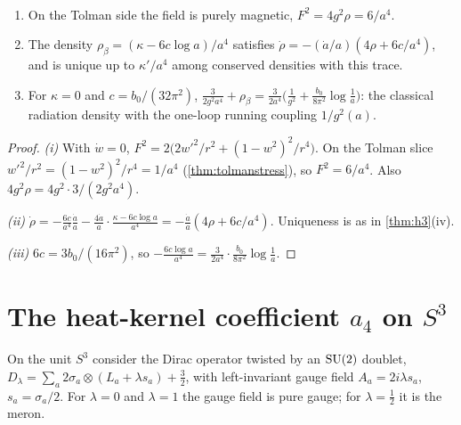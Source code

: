 \begin{proposition}\label{prop:running}\ver\
\begin{enumerate}[label=(\roman*)]
\item On the Tolman side the field is purely magnetic, $F^2=4g^2\rho=6/a^4$.
\item The density $\rho_\beta=(\kappa-6c\log a)/a^4$ satisfies $\dot\rho=-(\dot a/a)(4\rho+6c/a^4)$, and is unique up to $\kappa'/a^4$ among conserved densities with this trace.
\item For $\kappa=0$ and $c=b_0/(32\pi^2)$, $\frac3{2g^2a^4}+\rho_\beta=\frac3{2a^4}\bigl(\frac1{g^2}+\frac{b_0}{8\pi^2}\log\frac1a\bigr)$: the classical radiation density with the one-loop running coupling $1/g^2(a)$.
\end{enumerate}
\end{proposition}
\begin{proof}
\emph{(i)} With $\dot w=0$, $F^2=2\bigl(2w'^2/r^2+(1-w^2)^2/r^4\bigr)$. On the Tolman slice $w'^2/r^2=(1-w^2)^2/r^4=1/a^4$ (\cref{thm:tolmanstress}), so $F^2=6/a^4$. Also $4g^2\rho=4g^2\cdot3/(2g^2a^4)$.

\emph{(ii)} $\dot\rho=-\frac{6c}{a^4}\frac{\dot a}a-\frac{4\dot a}a\cdot\frac{\kappa-6c\log a}{a^4}=-\frac{\dot a}a(4\rho+6c/a^4)$. Uniqueness is as in \cref{thm:h3}(iv).

\emph{(iii)} $6c=3b_0/(16\pi^2)$, so $-\frac{6c\log a}{a^4}=\frac3{2a^4}\cdot\frac{b_0}{8\pi^2}\log\frac1a$.
\end{proof}


\section{The heat-kernel coefficient \texorpdfstring{$a_4$}{a4} on \texorpdfstring{$S^3$}{S3}}

On the unit $S^3$ consider the Dirac operator twisted by an $\mathrm{SU}(2)$ doublet, $D_\lambda=\sum_a2\sigma_a\otimes(L_a+\lambda s_a)+\frac32$, with left-invariant gauge field $A_a=2i\lambda s_a$, $s_a=\sigma_a/2$. For $\lambda=0$ and $\lambda=1$ the gauge field is pure gauge; for $\lambda=\frac12$ it is the meron.


